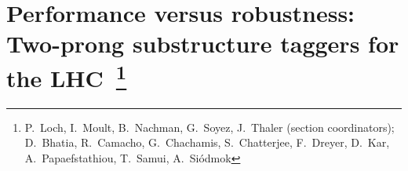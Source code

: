 %



%

%


\section{Performance versus robustness: Two-prong substructure taggers for the LHC~\protect\footnote{
    P.~Loch,
    I.~Moult,
    B.~Nachman,
    G.~Soyez,
    J.~Thaler (section coordinators); %
    D.~Bhatia,
    R.~Camacho,
    G.~Chachamis,
    S.~Chatterjee,
    F.~Dreyer,
    D.~Kar,
    A.~Papaefstathiou,
    T.~Samui,
    A.~Si\'{o}dmok}{}}
\label{sec:SM_jetsub_2prong}

